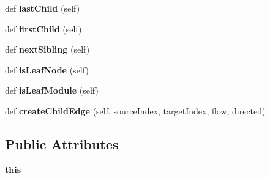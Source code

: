 \begin{DoxyCompactItemize}
\item 
\mbox{\label{classinfomap_1_1SNode_a65c3b44adda8cd5cc2a64fbf8d3db0bf}} 
def {\bfseries last\+Child} (self)
\item 
\mbox{\label{classinfomap_1_1SNode_a6ec03d7c6d83192e5f6da922b24cb32a}} 
def {\bfseries first\+Child} (self)
\item 
\mbox{\label{classinfomap_1_1SNode_a8b3cfbd304d9f6ca091ad6014e7ca043}} 
def {\bfseries next\+Sibling} (self)
\item 
\mbox{\label{classinfomap_1_1SNode_affadafaf13a34ad9bc12a4a9050226c2}} 
def {\bfseries is\+Leaf\+Node} (self)
\item 
\mbox{\label{classinfomap_1_1SNode_ad35d847a1f5e3758f0f92f39bc7f88c5}} 
def {\bfseries is\+Leaf\+Module} (self)
\item 
\mbox{\label{classinfomap_1_1SNode_a00ab25be3b589ce44ba741a21a94c67d}} 
def {\bfseries create\+Child\+Edge} (self, source\+Index, target\+Index, flow, directed)
\end{DoxyCompactItemize}
\subsection*{Public Attributes}
\begin{DoxyCompactItemize}
\item 
\mbox{\label{classinfomap_1_1SNode_ae0053e64794077321b2832d4d00bfcc0}} 
{\bfseries this}
\end{DoxyCompactItemize}
